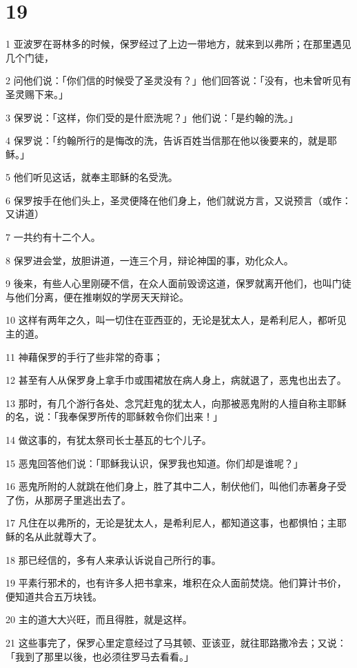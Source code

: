 \chapter{19}

\par 1 亚波罗在哥林多的时候，保罗经过了上边一带地方，就来到以弗所；在那里遇见几个门徒，
\par 2 问他们说：「你们信的时候受了圣灵没有？」他们回答说：「没有，也未曾听见有圣灵赐下来。」
\par 3 保罗说：「这样，你们受的是什麽洗呢？」他们说：「是约翰的洗。」
\par 4 保罗说：「约翰所行的是悔改的洗，告诉百姓当信那在他以後要来的，就是耶稣。」
\par 5 他们听见这话，就奉主耶稣的名受洗。
\par 6 保罗按手在他们头上，圣灵便降在他们身上，他们就说方言，又说预言（或作：又讲道）
\par 7 一共约有十二个人。
\par 8 保罗进会堂，放胆讲道，一连三个月，辩论神国的事，劝化众人。
\par 9 後来，有些人心里刚硬不信，在众人面前毁谤这道，保罗就离开他们，也叫门徒与他们分离，便在推喇奴的学房天天辩论。
\par 10 这样有两年之久，叫一切住在亚西亚的，无论是犹太人，是希利尼人，都听见主的道。
\par 11 神藉保罗的手行了些非常的奇事；
\par 12 甚至有人从保罗身上拿手巾或围裙放在病人身上，病就退了，恶鬼也出去了。
\par 13 那时，有几个游行各处、念咒赶鬼的犹太人，向那被恶鬼附的人擅自称主耶稣的名，说：「我奉保罗所传的耶稣敕令你们出来！」
\par 14 做这事的，有犹太祭司长士基瓦的七个儿子。
\par 15 恶鬼回答他们说：「耶稣我认识，保罗我也知道。你们却是谁呢？」
\par 16 恶鬼所附的人就跳在他们身上，胜了其中二人，制伏他们，叫他们赤著身子受了伤，从那房子里逃出去了。
\par 17 凡住在以弗所的，无论是犹太人，是希利尼人，都知道这事，也都惧怕；主耶稣的名从此就尊大了。
\par 18 那已经信的，多有人来承认诉说自己所行的事。
\par 19 平素行邪术的，也有许多人把书拿来，堆积在众人面前焚烧。他们算计书价，便知道共合五万块钱。
\par 20 主的道大大兴旺，而且得胜，就是这样。
\par 21 这些事完了，保罗心里定意经过了马其顿、亚该亚，就往耶路撒冷去；又说：「我到了那里以後，也必须往罗马去看看。」
